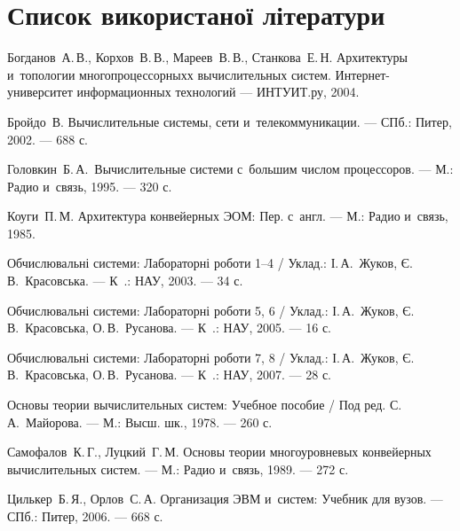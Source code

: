 \documentclass[
	a4paper,
	oneside,
	BCOR = 10mm,
	DIV = 12,
	12pt,
	headings = normal,
]{scrartcl}
\begin{document}
		\section{Список використаної літератури}
			\begin{manualbib}[widest=10]
				\item Богданов~А.\,В., Корхов~В.\,В., Мареев~В.\,В., Станкова~Е.\,Н. Архитектуры и~топологии многопроцессорныхх вычислительных систем. Интернет-университет информационных технологий — ИНТУИТ.ру, 2004.
				\item Бройдо~В. Вычислительные системы, сети и~телекоммуникации. — СПб.: Питер, 2002. — 688 с.
				\item Головкин~Б.\,А.~Вычислительные системи с~большим числом процессоров. — М.: Радио и~связь, 1995. — 320 с.
				\item Коуги~П.\,М. Архитектура конвейерных ЭОМ: Пер. с~англ. — М.: Радио и~связь, 1985.
				\item Обчислювальні системи: Лабораторні роботи 1–4 / Уклад.: І.\,А.~Жуков, Є.\,В.~Красовська. — К~.: НАУ, 2003. — 34 с.
				\item Обчислювальні системи: Лабораторні роботи 5, 6 / Уклад.: І.\,А.~Жуков, Є.\,В.~Красовська, О.\,В.~Русанова. — К~.: НАУ, 2005. — 16 с.
				\item Обчислювальні системи: Лабораторні роботи 7, 8 / Уклад.: І.\,А.~Жуков, Є.\,В.~Красовська, О.\,В.~Русанова. — К~.: НАУ, 2007. — 28 с.
				\item Основы теории вычислительных систем: Учебное пособие / Под ред. С.\,А.~Майорова. — М.: Высш. шк., 1978. — 260 с.
				\item Самофалов~К.\,Г., Луцкий~Г.\,М. Основы теории многоуровневых конвейерных вычислительных систем. — М.: Радио и~связь, 1989. — 272 с.
				\item Цилькер~Б.\,Я., Орлов~С.\,А. Организация ЭВМ и~систем: Учебник для вузов. — СПб.: Питер, 2006. — 668 с. 
			\end{manualbib}
\end{document}
